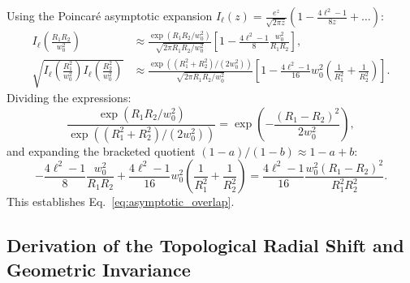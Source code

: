 \documentclass{optica-article}
\begin{document}
Using the Poincaré asymptotic expansion $I_\ell(z) = \frac{e^z}{\sqrt{2\pi z}} (1 - \frac{4\ell^2 - 1}{8z} + \dots)$:
\begin{align}
I_\ell\left( \frac{R_1 R_2}{w_0^2} \right) &\approx \frac{\exp(R_1 R_2 / w_0^2)}{\sqrt{2\pi R_1 R_2 / w_0^2}} \left[ 1 - \frac{4\ell^2 - 1}{8} \frac{w_0^2}{R_1 R_2} \right], \\
\sqrt{I_\ell\left( \frac{R_1^2}{w_0^2} \right) I_\ell\left( \frac{R_2^2}{w_0^2} \right)} &\approx \frac{\exp((R_1^2 + R_2^2) / (2 w_0^2))}{\sqrt{2\pi R_1 R_2 / w_0^2}} \left[ 1 - \frac{4\ell^2 - 1}{16} w_0^2 \left( \frac{1}{R_1^2} + \frac{1}{R_2^2} \right) \right].
\end{align}
Dividing the expressions:
\begin{equation}
\frac{\exp(R_1 R_2 / w_0^2)}{\exp((R_1^2 + R_2^2) / (2 w_0^2))} = \exp\left( - \frac{(R_1 - R_2)^2}{2 w_0^2} \right),
\end{equation}
and expanding the bracketed quotient $(1 - a)/(1 - b) \approx 1 - a + b$:
\begin{equation}
- \frac{4\ell^2 - 1}{8} \frac{w_0^2}{R_1 R_2} + \frac{4\ell^2 - 1}{16} w_0^2 \left( \frac{1}{R_1^2} + \frac{1}{R_2^2} \right) = \frac{4\ell^2 - 1}{16} \frac{w_0^2 (R_1 - R_2)^2}{R_1^2 R_2^2}.
\end{equation}
This establishes Eq.~\eqref{eq:asymptotic_overlap}.

\subsection{Derivation of the Topological Radial Shift and Geometric Invariance}
\end{document}
